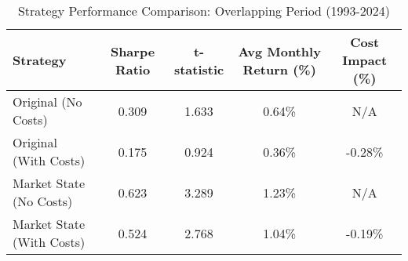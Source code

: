 \begin{table}[htbp]
\caption{Strategy Performance Comparison: Overlapping Period (1993-2024)}
\label{tab:strategy_comparison_overlap}
\begin{tabular}{l|cccc}
\hline
Strategy & Sharpe Ratio & t-statistic & Avg Monthly Return (\%) & Cost Impact (\%) \\
\hline
Original (No Costs) & 0.309 & 1.633 & 0.64\% & N/A \\
Original (With Costs) & 0.175 & 0.924 & 0.36\% & -0.28\% \\
Market State (No Costs) & 0.623 & 3.289 & 1.23\% & N/A \\
Market State (With Costs) & 0.524 & 2.768 & 1.04\% & -0.19\% \\
\hline
\end{tabular}
\end{table}

